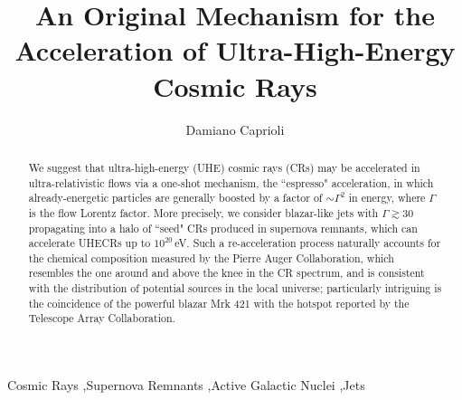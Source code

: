 \documentclass[3p,times,twocolumn]{elsarticle}
\begin{document}
\begin{frontmatter}


\author{Damiano Caprioli}
\address{University of Chicago, Department of Astronomy \& Astrophysics,
5640 S Ellis Ave., Chicago, IL 60637, USA}

\dochead{}

\title{An Original Mechanism for the Acceleration of Ultra-High-Energy Cosmic Rays}




\begin{abstract}
We suggest that ultra-high-energy (UHE) cosmic rays (CRs) may be accelerated in ultra-relativistic flows via a one-shot mechanism, the 
 ``espresso" acceleration, in which already-energetic particles are generally boosted by a factor of $\sim\Gamma^2$ in energy, where $\Gamma$ is the flow Lorentz factor. 
More precisely, we consider blazar-like jets with $\Gamma\gtrsim 30$ propagating into a halo of ``seed" CRs produced in supernova remnants, which can accelerate UHECRs up to $10^{20}$\,eV.
Such a re-acceleration process naturally accounts for the chemical composition measured by the Pierre Auger Collaboration, which resembles the one around and above the knee in the CR spectrum, and is consistent with the distribution of potential sources in the local universe; particularly intriguing is the coincidence of the powerful blazar Mrk 421 with the hotspot reported by the Telescope Array Collaboration.
\end{abstract}

\begin{keyword}
Cosmic Rays \sep Supernova Remnants \sep Active Galactic Nuclei \sep Jets

\end{keyword}

\end{frontmatter}
\end{document}
